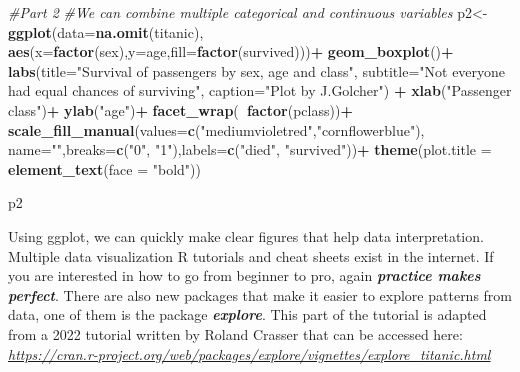 \documentclass[]{article}
\newenvironment{Shaded}{\begin{snugshade}}{\end{snugshade}}
\newcommand{\CommentTok}[1]{\textcolor[rgb]{0.56,0.35,0.01}{\textit{#1}}}
\newcommand{\DataTypeTok}[1]{\textcolor[rgb]{0.13,0.29,0.53}{#1}}
\newcommand{\KeywordTok}[1]{\textcolor[rgb]{0.13,0.29,0.53}{\textbf{#1}}}
\newcommand{\NormalTok}[1]{#1}
\newcommand{\OperatorTok}[1]{\textcolor[rgb]{0.81,0.36,0.00}{\textbf{#1}}}
\newcommand{\StringTok}[1]{\textcolor[rgb]{0.31,0.60,0.02}{#1}}
\begin{document}
\begin{Shaded}
\begin{Highlighting}[]
\CommentTok{#Part 2}
\CommentTok{#We can combine multiple categorical and continuous variables}
\NormalTok{p2<-}\KeywordTok{ggplot}\NormalTok{(}\DataTypeTok{data=}\KeywordTok{na.omit}\NormalTok{(titanic),}
           \KeywordTok{aes}\NormalTok{(}\DataTypeTok{x=}\KeywordTok{factor}\NormalTok{(sex),}\DataTypeTok{y=}\NormalTok{age,}\DataTypeTok{fill=}\KeywordTok{factor}\NormalTok{(survived)))}\OperatorTok{+}
\StringTok{  }\KeywordTok{geom_boxplot}\NormalTok{()}\OperatorTok{+}
\StringTok{  }\KeywordTok{labs}\NormalTok{(}\DataTypeTok{title=}\StringTok{"Survival of passengers by sex, age and class"}\NormalTok{,}
       \DataTypeTok{subtitle=}\StringTok{"Not everyone had equal chances of surviving"}\NormalTok{, }
       \DataTypeTok{caption=}\StringTok{"Plot by J.Golcher"}\NormalTok{) }\OperatorTok{+}
\StringTok{  }\KeywordTok{xlab}\NormalTok{(}\StringTok{"Passenger class"}\NormalTok{)}\OperatorTok{+}
\StringTok{  }\KeywordTok{ylab}\NormalTok{(}\StringTok{"age"}\NormalTok{)}\OperatorTok{+}
\StringTok{  }\KeywordTok{facet_wrap}\NormalTok{(}\OperatorTok{~}\KeywordTok{factor}\NormalTok{(pclass))}\OperatorTok{+}
\StringTok{  }\KeywordTok{scale_fill_manual}\NormalTok{(}\DataTypeTok{values=}\KeywordTok{c}\NormalTok{(}\StringTok{"mediumvioletred"}\NormalTok{,}\StringTok{"cornflowerblue"}\NormalTok{),}
                    \DataTypeTok{name=}\StringTok{""}\NormalTok{,}\DataTypeTok{breaks=}\KeywordTok{c}\NormalTok{(}\StringTok{"0"}\NormalTok{, }\StringTok{"1"}\NormalTok{),}\DataTypeTok{labels=}\KeywordTok{c}\NormalTok{(}\StringTok{"died"}\NormalTok{, }\StringTok{"survived"}\NormalTok{))}\OperatorTok{+}
\StringTok{  }\KeywordTok{theme}\NormalTok{(}\DataTypeTok{plot.title =} \KeywordTok{element_text}\NormalTok{(}\DataTypeTok{face =} \StringTok{"bold"}\NormalTok{))}

\NormalTok{p2}
\end{Highlighting}
\end{Shaded}

Using ggplot, we can quickly make clear figures that help data
interpretation. Multiple data visualization R tutorials and cheat sheets
exist in the internet. If you are interested in how to go from beginner
to pro, again \textbf{\emph{practice makes perfect}}. There are also new
packages that make it easier to explore patterns from data, one of them
is the package \textbf{\emph{explore}}. This part of the tutorial is
adapted from a 2022 tutorial written by Roland Crasser that can be
accessed here:
\emph{\url{https://cran.r-project.org/web/packages/explore/vignettes/explore_titanic.html}}
\end{document}
